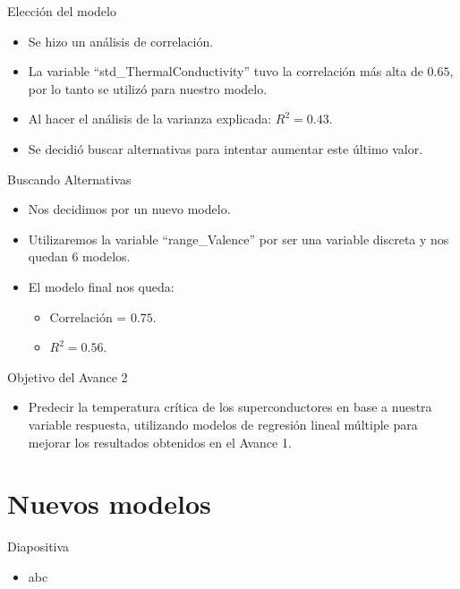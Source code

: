 \documentclass[11pt]{beamer}
\begin{document}
\begin{frame}{Elección del modelo}
	\begin{itemize}
		\item Se hizo un análisis de correlación.
		\pause
		\item La variable ``std\_ThermalConductivity'' tuvo la correlación más alta de $0.65$, por lo tanto se utilizó para nuestro modelo.
		\pause
		\item Al hacer el análisis de la varianza explicada: $R^2=0.43$.
		\pause
		\item Se decidió buscar alternativas para intentar aumentar este último valor.
	\end{itemize}
\end{frame}

\begin{frame}{Buscando Alternativas}
	\begin{itemize}
		\item  Nos decidimos por un nuevo modelo.
		\pause
		\item  Utilizaremos la variable ``range\_Valence'' por ser una variable discreta y nos quedan 6 modelos. 
		\pause
		\item  El modelo final nos queda:
		\begin{itemize}
			\pause
			\item  Correlación = $0.75$.
			\pause
			\item  $R^2 = 0.56$.
		\end{itemize}
	\end{itemize}
\end{frame}

\begin{frame}{Objetivo del Avance 2}
	\begin{itemize}
		\item Predecir la temperatura crítica de los superconductores en base a nuestra variable respuesta, utilizando modelos de regresión lineal múltiple para mejorar los resultados obtenidos en el Avance 1.
	\end{itemize}
\end{frame}


\section{Nuevos modelos}

\begin{frame}{Diapositiva}
	\begin{itemize}
		\item abc
	\end{itemize}
\end{frame}
\end{document}
